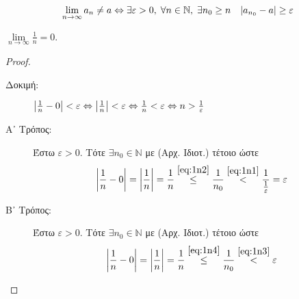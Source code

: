 \documentclass[main.tex]{subfiles}
\begin{document}
\begin{rem}
  \[
    \lim_{n \to \infty} a_{n} \neq a \Leftrightarrow \exists 
    \varepsilon >0, \; \forall n \in \mathbb{N}, \; \exists n_{0} 
    \geq n \quad \abs{a_{n_{0}}-a} \geq \varepsilon 
  \] 
\end{rem}


\begin{examples}
\item {}
  \begin{enumerate}[i)]
    \item $ \lim\limits_{n \to \infty} \frac{1}{n} = 0 $.
      \begin{proof}
      \item {}
        \begin{description}
          \item[Δοκιμή:] $ \abs{\frac{1}{n} -0} < \varepsilon
            \Leftrightarrow \abs{\frac{1}{n}} < \varepsilon 
            \Leftrightarrow \frac{1}{n} < \varepsilon 
            \Leftrightarrow n > \frac{1}{\varepsilon}$
        \end{description}
        \begin{description}
          \item[Α᾽ Τρόπος:] 
            Έστω $ \varepsilon >0 $. Τότε $ \exists n_{0} \in
            \mathbb{N} $ με  (Αρχ. Ιδιοτ.) τέτοιο 
            ώστε 
            \[
              \abs{\frac{1}{n} -0} = \abs{\frac{1}{n}} =
              \frac{1}{n} \overset{\eqref{eq:1n2}}{\leq}
              \frac{1}{n_{0}} \overset{\eqref{eq:1n1}}{<} 
              \frac{1}{\frac{1}{\varepsilon}} = \varepsilon 
            \]

          \item [Β᾽ Τρόπος:]
            Έστω $ \varepsilon >0 $. Τότε $ \exists n_{0} \in
            \mathbb{N} $ με  (Αρχ. Ιδιοτ.) 
            τέτοιο ώστε 
            \[
              \abs{\frac{1}{n} -0} = \abs{\frac{1}{n}} =
              \frac{1}{n} \overset{\eqref{eq:1n4}}{\leq}
              \frac{1}{n_{0}} \overset{\eqref{eq:1n3}}{<} 
              \varepsilon 
            \]
        \end{description}
      \end{proof}


\end{enumerate}
\end{examples}
\end{document}
